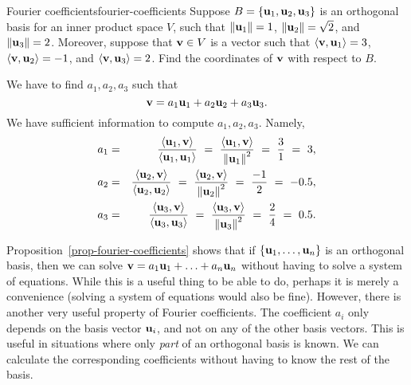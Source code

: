 \begin{example}{Fourier coefficients}{fourier-coefficients}
  Suppose $B=\set{\vect{u}_1,\vect{u}_2,\vect{u}_3}$ is an orthogonal
  basis for an inner product space $V$, such that
  $\norm{\vect{u}_1}=1$, $\norm{\vect{u}_2}=\sqrt{2}$, and
  $\norm{\vect{u}_3}=2$.  Moreover, suppose that $\vect{v}\in V$ is a
  vector such that $\iprod{\vect{v},\vect{u}_1} = 3$,
  $\iprod{\vect{v},\vect{u}_2} = -1$, and
  $\iprod{\vect{v},\vect{u}_3} = 2$.  Find the coordinates of
  $\vect{v}$ with respect to $B$.
\end{example}

\begin{solution}
  We have to find $a_1,a_2,a_3$ such that
  \begin{equation*}
    \vect{v} = a_1\vect{u}_1 + a_2\vect{u}_2 + a_3\vect{u}_3.
  \end{equation*}
  We have sufficient information to compute $a_1,a_2,a_3$. Namely,
  \begin{eqnarray*}
    a_1
    &=& \frac{\iprod{\vect{u}_1,\vect{v}}}{\iprod{\vect{u}_1,\vect{u}_1}}
        ~=~ \frac{\iprod{\vect{u}_1,\vect{v}}}{\norm{\vect{u}_1}^2}
        ~=~ \frac{3}{1} ~=~ 3, \\
    a_2
    &=& \frac{\iprod{\vect{u}_2,\vect{v}}}{\iprod{\vect{u}_2,\vect{u}_2}}
        ~=~ \frac{\iprod{\vect{u}_2,\vect{v}}}{\norm{\vect{u}_2}^2}
        ~=~ \frac{-1}{2} ~=~ -0.5, \\
    a_3
    &=& \frac{\iprod{\vect{u}_3,\vect{v}}}{\iprod{\vect{u}_3,\vect{u}_3}}
        ~=~ \frac{\iprod{\vect{u}_3,\vect{v}}}{\norm{\vect{u}_3}^2}
        ~=~ \frac{2}{4} ~=~ 0.5.
  \end{eqnarray*}
\end{solution}

Proposition~\ref{prop-fourier-coefficients} shows that if
$\set{\vect{u}_1,\ldots,\vect{u}_n}$ is an orthogonal basis, then we
can solve $\vect{v} = a_1\vect{u}_1 + \ldots + a_n\vect{u}_n$ without
having to solve a system of equations. While this is a useful thing to
be able to do, perhaps it is merely a convenience (solving a system of
equations would also be fine). However, there is another very useful
property of Fourier coefficients. The coefficient $a_i$ only depends
on the basis vector $\vect{u}_i$, and not on any of the other basis
vectors. This is useful in situations where only {\em part} of an
orthogonal basis is known. We can calculate the corresponding
coefficients without having to know the rest of the basis.

